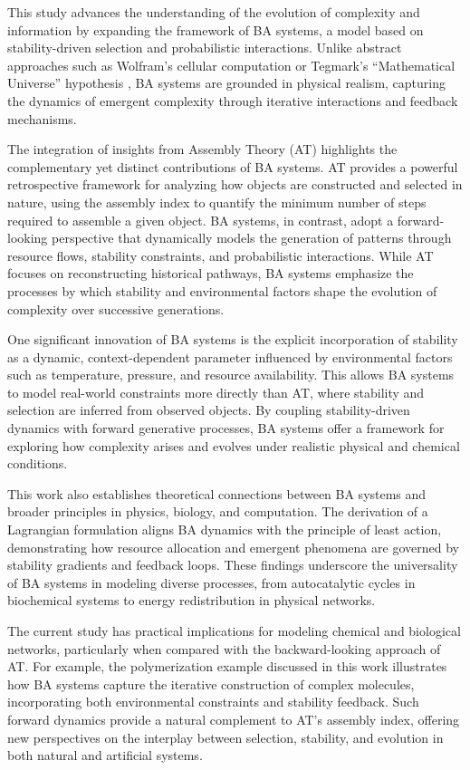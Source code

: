 \documentclass[entropy,article,submit,pdftex,oneauthor]{Definitions/mdpi}
\begin{document}
This study advances the understanding of the evolution of complexity and information by expanding the framework of BA systems, a model based on stability-driven selection and probabilistic interactions. Unlike abstract approaches such as Wolfram’s cellular computation \cite{wolfram2020fundamental} or Tegmark’s “Mathematical Universe” hypothesis \cite{tegmark2008mathematical}, BA systems are grounded in physical realism, capturing the dynamics of emergent complexity through iterative interactions and feedback mechanisms.

The integration of insights from Assembly Theory (AT) \cite{walker2023nature} highlights the complementary yet distinct contributions of BA systems. AT provides a powerful retrospective framework for analyzing how objects are constructed and selected in nature, using the assembly index to quantify the minimum number of steps required to assemble a given object. BA systems, in contrast, adopt a forward-looking perspective that dynamically models the generation of patterns through resource flows, stability constraints, and probabilistic interactions. While AT focuses on reconstructing historical pathways, BA systems emphasize the processes by which stability and environmental factors shape the evolution of complexity over successive generations. 

One significant innovation of BA systems is the explicit incorporation of stability as a dynamic, context-dependent parameter influenced by environmental factors such as temperature, pressure, and resource availability. This allows BA systems to model real-world constraints more directly than AT, where stability and selection are inferred from observed objects. By coupling stability-driven dynamics with forward generative processes, BA systems offer a framework for exploring how complexity arises and evolves under realistic physical and chemical conditions.

This work also establishes theoretical connections between BA systems and broader principles in physics, biology, and computation. The derivation of a Lagrangian formulation aligns BA dynamics with the principle of least action, demonstrating how resource allocation and emergent phenomena are governed by stability gradients and feedback loops. These findings underscore the universality of BA systems in modeling diverse processes, from autocatalytic cycles in biochemical systems to energy redistribution in physical networks.

The current study has practical implications for modeling chemical and biological networks, particularly when compared with the backward-looking approach of AT. For example, the polymerization example discussed in this work illustrates how BA systems capture the iterative construction of complex molecules, incorporating both environmental constraints and stability feedback. Such forward dynamics provide a natural complement to AT’s assembly index, offering new perspectives on the interplay between selection, stability, and evolution in both natural and artificial systems.
\end{document}
